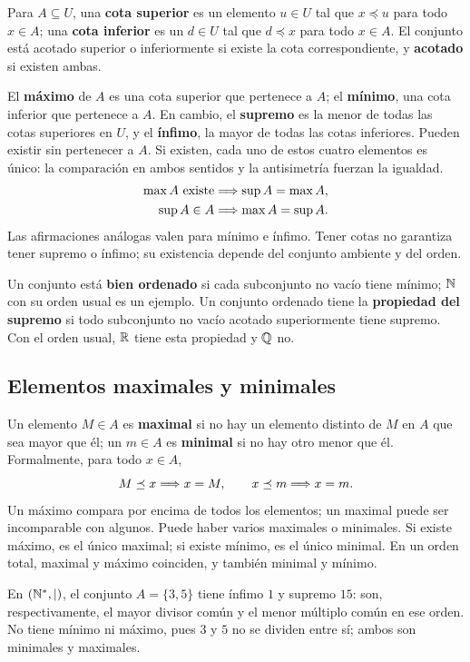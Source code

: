 Para $A\subseteq U$, una \textbf{cota superior} es un elemento $u\in U$
tal que $x\preceq u$ para todo $x\in A$; una \textbf{cota inferior}
es un $d\in U$ tal que $d\preceq x$ para todo $x\in A$.
El conjunto está acotado superior o inferiormente si existe la cota
correspondiente, y \textbf{acotado} si existen ambas.

El \textbf{máximo} de $A$ es una cota superior que pertenece a $A$;
el \textbf{mínimo}, una cota inferior que pertenece a $A$.
En cambio, el \textbf{supremo} es la menor de todas las cotas superiores
en $U$, y el \textbf{ínfimo}, la mayor de todas las cotas inferiores.
Pueden existir sin pertenecer a $A$. Si existen, cada uno de estos
cuatro elementos es único: la comparación en ambos sentidos y la
antisimetría fuerzan la igualdad.
\begin{align*}
 \max A\text{ existe}&\Longrightarrow\sup A=\max A,\\
 \sup A\in A&\Longrightarrow\max A=\sup A.
\end{align*}
Las afirmaciones análogas valen para mínimo e ínfimo.
Tener cotas no garantiza tener supremo o ínfimo; su existencia depende
del conjunto ambiente y del orden.

Un conjunto está \textbf{bien ordenado} si cada subconjunto no vacío
tiene mínimo; $\mathbb{N}$ con su orden usual es un ejemplo.
Un conjunto ordenado tiene la \textbf{propiedad del supremo} si todo
subconjunto no vacío acotado superiormente tiene supremo.
Con el orden usual, $\mathbb{R}$ tiene esta propiedad y $\mathbb{Q}$ no.

\subsection*{Elementos maximales y minimales}

Un elemento $M\in A$ es \textbf{maximal} si no hay un elemento distinto
de $M$ en $A$ que sea mayor que él; un $m\in A$ es \textbf{minimal}
si no hay otro menor que él. Formalmente, para todo $x\in A$,
\[
 M\preceq x\Longrightarrow x=M,\qquad x\preceq m\Longrightarrow x=m.
\]
Un máximo compara por encima de todos los elementos; un maximal
puede ser incomparable con algunos. Puede haber varios maximales
o minimales. Si existe máximo, es el único maximal; si existe mínimo,
es el único minimal. En un orden total, maximal y máximo coinciden,
y también minimal y mínimo.

\begin{ejemplo}
En $(\mathbb{N}^*,\mid)$, el conjunto $A=\{3,5\}$ tiene ínfimo $1$ y
supremo $15$: son, respectivamente, el mayor divisor común y el menor
múltiplo común en ese orden. No tiene mínimo ni máximo, pues $3$ y $5$
no se dividen entre sí; ambos son minimales y maximales.
\end{ejemplo}

